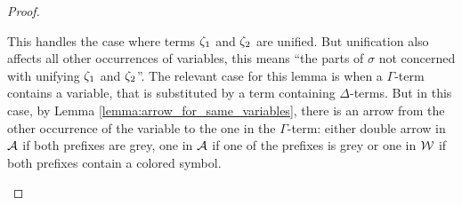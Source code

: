 \documentclass[,%
	paper=a4,%
	DIV12, %
	twoside=false,%
	liststotoc,
	bibtotoc,
	draft=false,%
	numbers=noendperiod
]{scrartcl}
\begin{document}
\begin{proof}
\begin{itemize}
\begin{enumerate}
					This handles the case where terms $\zeta_{1}$ and $\zeta_{2}$ are unified. 
					But unification also affects all other occurrences of variables, this means ``the parts of $\sigma$ not concerned with unifying $\zeta_{1}$ and $\zeta_{2}$''.
					The relevant case for this lemma is when a $\Gamma$-term contains a variable, that is substituted by a term containing $\Delta$-terms.
					But in this case, by Lemma \ref{lemma:arrow_for_same_variables}, there is an arrow from the other occurrence of the variable to the one in the $\Gamma$-term: either double arrow in $\operatorname{\mathcal{A}}$ if both prefixes are grey, one in $\operatorname{\mathcal{A}}$ if one of the prefixes is grey or one in $\operatorname{\mathcal{W}}$ if both prefixes contain a colored symbol.
					\qedhere
			\end{enumerate}
	\end{itemize}
\end{proof}
\end{document}
